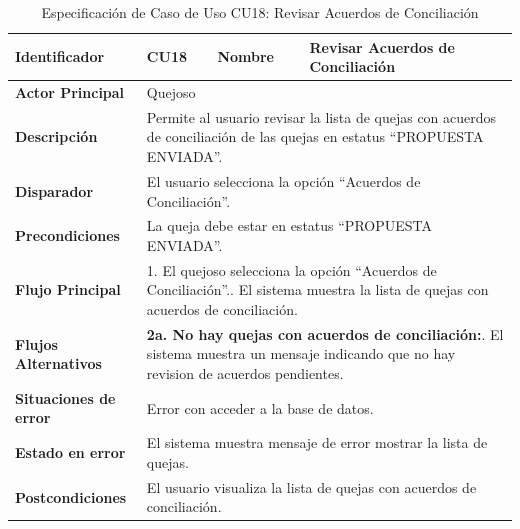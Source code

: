\vspace{0.8cm}

\begingroup
\setlength{\parskip}{0pt}
\begin{longtable}{|p{3.5cm}|p{2cm}|p{2.5cm}|p{7cm}|}
\caption{Especificación de Caso de Uso CU18: Revisar Acuerdos de Conciliación}
\label{tab:cu18_revisar_acuerdos} \\
\hline
\textbf{Identificador} & CU18 & \textbf{Nombre} & Revisar Acuerdos de Conciliación \\ \hline
\textbf{Actor Principal} & \multicolumn{3}{p{11.5cm}|}{Quejoso} \\ \hline
\textbf{Descripción} & \multicolumn{3}{p{11.5cm}|}{Permite al usuario revisar la lista de quejas con acuerdos de conciliación de las quejas en estatus ``PROPUESTA ENVIADA''.} \\ \hline
\textbf{Disparador} & \multicolumn{3}{p{11.5cm}|}{El usuario selecciona la opción ``Acuerdos de Conciliación''.} \\ \hline
\textbf{Precondiciones} & \multicolumn{3}{p{11.5cm}|}{La queja debe estar en estatus ``PROPUESTA ENVIADA''.} \\ \hline
\textbf{Flujo Principal} & \multicolumn{3}{p{11.5cm}|}{1. El quejoso selecciona la opción ``Acuerdos de Conciliación''.\newline 2. El sistema muestra la lista de quejas con acuerdos de conciliación.} \\ \hline
\textbf{Flujos Alternativos} & \multicolumn{3}{p{11.5cm}|}{\textbf{2a. No hay quejas con acuerdos de conciliación:}\newline 1. El sistema muestra un mensaje indicando que no hay revision de acuerdos pendientes.} \\ \hline
\textbf{Situaciones de error} & \multicolumn{3}{p{11.5cm}|}{Error con acceder a la base de datos.} \\ \hline
\textbf{Estado en error} & \multicolumn{3}{p{11.5cm}|}{El sistema muestra mensaje de error mostrar la lista de quejas.} \\ \hline
\textbf{Postcondiciones} & \multicolumn{3}{p{11.5cm}|}{El usuario visualiza la lista de quejas con acuerdos de conciliación.} \\ \hline
\end{longtable}
\endgroup

\vspace{0.8cm}

